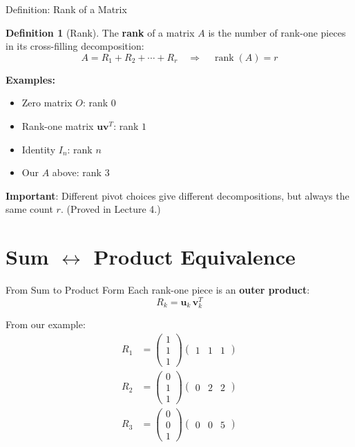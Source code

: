 \documentclass[10pt]{beamer}
\theoremstyle{definition}
\newtheorem{defi}{Definition}[section]
\newcommand{\x}[1]{\alert{\textbf{#1}}}
\begin{document}
\begin{frame}{Definition: Rank of a Matrix}
\begin{defi}[Rank]
The \x{rank} of a matrix $A$ is the number of rank-one pieces in its cross-filling decomposition:
$$A = R_1 + R_2 + \cdots + R_r \quad \Longrightarrow \quad \operatorname{rank}(A) = r$$
\end{defi}

\vspace{0.3cm}
\textbf{Examples:}
\begin{itemize}
\item Zero matrix $O$: rank $0$
\item Rank-one matrix $\mathbf{u}\mathbf{v}^T$: rank $1$
\item Identity $I_n$: rank $n$
\item Our $A$ above: rank $3$
\end{itemize}

\vspace{0.2cm}
\textbf{Important}: Different pivot choices give different decompositions, but always the same count $r$. (Proved in Lecture 4.)
\end{frame}

\section{Sum $\leftrightarrow$ Product Equivalence}

\begin{frame}{From Sum to Product Form}
Each rank-one piece is an \x{outer product}:
$$R_k = \mathbf{u}_k \, \mathbf{v}_k^T$$

\vfill
From our example:
\begin{align*}
R_1 &= \begin{pmatrix} 1 \\ 1 \\ 1 \end{pmatrix}
\begin{pmatrix} 1 & 1 & 1 \end{pmatrix} \\[6pt]
R_2 &= \begin{pmatrix} 0 \\ 1 \\ 1 \end{pmatrix}
\begin{pmatrix} 0 & 2 & 2 \end{pmatrix} \\[6pt]
R_3 &= \begin{pmatrix} 0 \\ 0 \\ 1 \end{pmatrix}
\begin{pmatrix} 0 & 0 & 5 \end{pmatrix}
\end{align*}
\end{frame}
\end{document}
